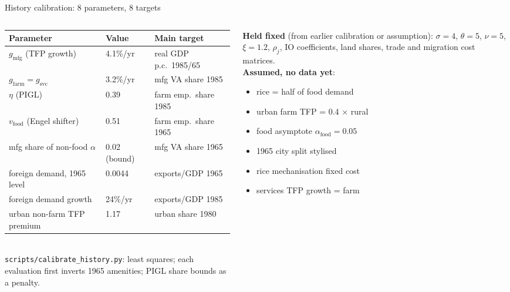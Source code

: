 \documentclass[10pt,aspectratio=169]{beamer}
\begin{document}
\begin{frame}{History calibration: 8 parameters, 8 targets}
  \begin{columns}[T]
    \begin{column}{0.6\textwidth}
      \scriptsize
      \begin{tabular}{@{}lll@{}}
        \toprule
        Parameter & Value & Main target \\
        \midrule
        $g_{\text{mfg}}$ (TFP growth) & 4.1\%/yr & real GDP p.c.\ 1985/65 \\
        $g_{\text{farm}}=g_{\text{svc}}$ & 3.2\%/yr & mfg VA share 1985 \\
        $\eta$ (PIGL) & 0.39 & farm emp.\ share 1985 \\
        $v_{\text{food}}$ (Engel shifter) & 0.51 & farm emp.\ share 1965 \\
        mfg share of non-food $\alpha$ & 0.02 (bound) & mfg VA share 1965 \\
        foreign demand, 1965 level & 0.0044 & exports/GDP 1965 \\
        foreign demand growth & 24\%/yr & exports/GDP 1985 \\
        urban non-farm TFP premium & 1.17 & urban share 1980 \\
        \bottomrule
      \end{tabular}\\[0.3em]
      \tiny \texttt{scripts/calibrate\_history.py}: least squares; each evaluation first
      inverts 1965 amenities; PIGL share bounds as a penalty.
    \end{column}
    \begin{column}{0.36\textwidth}
      \footnotesize
      \textbf{Held fixed} (from earlier calibration or assumption): $\sigma=4$,
      $\theta=5$, $\nu=5$, $\xi=1.2$, $\rho_j$, IO coefficients, land shares, trade and
      migration cost matrices.\\[0.4em]
      \textbf{Assumed, no data yet}:
      \begin{itemize}\footnotesize
        \item rice = half of food demand
        \item urban farm TFP = 0.4 $\times$ rural
        \item food asymptote $\alpha_{\text{food}}=0.05$
        \item 1965 city split stylised
        \item rice mechanisation fixed cost
        \item services TFP growth = farm
      \end{itemize}
    \end{column}
  \end{columns}
\end{frame}
\end{document}
